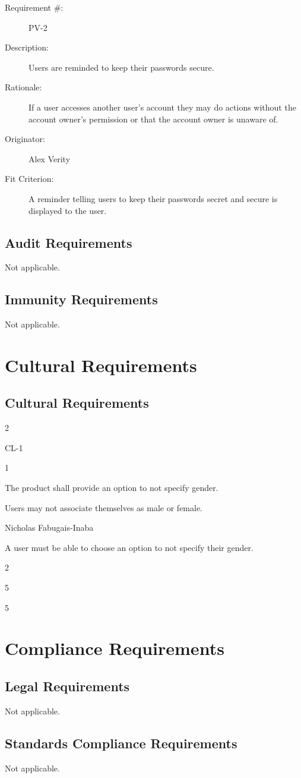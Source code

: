 \documentclass[12pt]{article}
\newenvironment{myreq}[1]{%
\setlist[description]{font=\normalfont\color{darkgray}}%
\begin{tcolorbox}[colframe=black,colback=white, sharp corners, boxrule=1pt]%
\bfseries\color{blue}%
\begin{description}#1}%
{\end{description}\end{tcolorbox}}
\newcommand{\twoinline}[2]{\begin{multicols}{2}#1 #2\end{multicols}}
\newcommand{\reqno}{\item[Requirement \#:]}
\newcommand{\reqevent}{\item[Event/BUC/PUC \#:]}
\newcommand{\reqdesc}{\item[Description:]}
\newcommand{\reqrat}{\item[Rationale:]}
\newcommand{\reqorig}{\item[Originator:]}
\newcommand{\reqfit}{\item[Fit Criterion:]}
\newcommand{\reqsatis}{\item[Customer Satisfaction:]}
\newcommand{\reqdissat}{\item[Customer Dissatisfaction:]}
\begin{document}
\begin{myreq}
  \reqno PV-2
  \reqdesc Users are reminded to keep their passwords secure.
  \reqrat If a user accesses another user's account they may do actions
  without the account owner's permission or that the account owner is unaware
  of.
  \reqorig Alex Verity
  \reqfit A reminder telling users to keep their passwords secret and secure
  is displayed to the user.
  \twoinline
    {\reqsatis 1}
    {\reqdissat 1}
\end{myreq}

\subsection{Audit Requirements}
Not applicable.
\subsection{Immunity Requirements}
Not applicable.

\section{Cultural Requirements}
\subsection{Cultural Requirements}

\begin{myreq}
  \twoinline
    {\reqno CL-1}
    {\reqevent 1}
  \reqdesc The product shall provide an option to not specify gender.
  \reqrat Users may not associate themselves as male or female.
  \reqorig Nicholas Fabugais-Inaba
  \reqfit A user must be able to choose an option to not specify their
  gender.
  \twoinline
    {\reqsatis 5}
    {\reqdissat 5} 
\end{myreq}

\section{Compliance Requirements}
\subsection{Legal Requirements}
Not applicable.
\subsection{Standards Compliance Requirements}
Not applicable.
\end{document}

